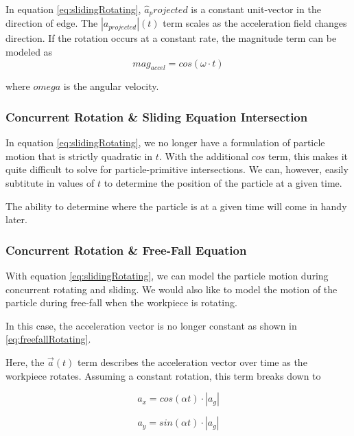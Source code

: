  {
	\label{eq:slidingRotating}
}

In equation \eqref{eq:slidingRotating}, $\hat{a}_projected$ is a constant unit-vector in the direction of edge. The $|a_{projected}|(t)$ term scales as the acceleration field changes direction. If the rotation occurs at a constant rate, the magnitude term can be modeled as
$$
mag_{accel} = cos(\omega \cdot t)
$$

where $omega$ is the angular velocity.

		\subsubsection{Concurrent Rotation \& Sliding Equation Intersection}

In equation \eqref{eq:slidingRotating}, we no longer have a formulation of particle motion that is strictly quadratic in $t$. With the additional $cos$ term, this makes it quite difficult to solve for particle-primitive intersections. We can, however, easily subtitute in values of $t$ to determine the position of the particle at a given time.

The ability to determine where the particle is at a given time will come in handy later.

		\subsubsection{Concurrent Rotation \& Free-Fall Equation}

With equation \eqref{eq:slidingRotating}, we can model the particle motion during concurrent rotating and sliding. We would also like to model the motion of the particle during free-fall when the workpiece is rotating.

In this case, the acceleration vector is no longer constant as shown in \eqref{eq:freefallRotating}.

 {
	\label{eq:freefallRotating}
}

Here, the $\vec{a}(t)$ term describes the acceleration vector over time as the workpiece rotates. Assuming a constant rotation, this term breaks down to

$$
a_x = cos(\alpha t) \cdot |a_g|
$$

$$
a_y = sin(\alpha t) \cdot |a_g|
$$

